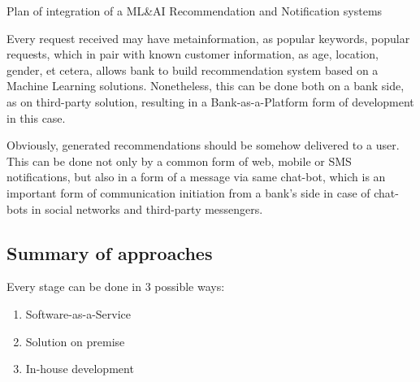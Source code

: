 \begin{table}
    \centering
    \caption{Plan of integration of a ML\&AI Recommendation and Notification systems}
    \medskip
\end{table}

Every request received may have metainformation, as popular keywords, popular requests, which in pair with known customer information, as age, location, gender, et cetera, allows bank to build recommendation system based on a Machine Learning solutions.
Nonetheless, this can be done both on a bank side, as on third-party solution, resulting in a Bank-as-a-Platform form of development in this case.

Obviously, generated recommendations should be somehow delivered to a user.
This can be done not only by a common form of web, mobile or SMS notifications, but also in a form of a message via same chat-bot, which is an important form of communication initiation from a bank's side in case of chat-bots in social networks and third-party messengers.

\subsection{Summary of approaches}

Every stage can be done in 3 possible ways:
\begin{enumerate}
    \item Software-as-a-Service
    \item Solution on premise
    \item In-house development
\end{enumerate}

